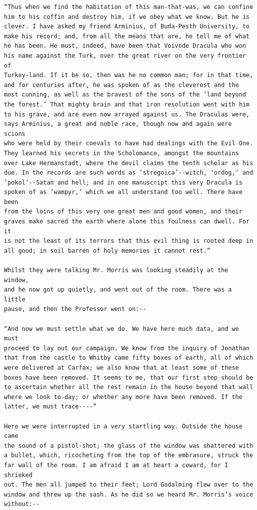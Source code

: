 \documentclass{article}
\begin{document}
\begin{verbatim}
“Thus when we find the habitation of this man-that-was, we can confine
him to his coffin and destroy him, if we obey what we know. But he is
clever. I have asked my friend Arminius, of Buda-Pesth University, to
make his record; and, from all the means that are, he tell me of what
he has been. He must, indeed, have been that Voivode Dracula who won
his name against the Turk, over the great river on the very frontier of
Turkey-land. If it be so, then was he no common man; for in that time,
and for centuries after, he was spoken of as the cleverest and the
most cunning, as well as the bravest of the sons of the ‘land beyond
the forest.’ That mighty brain and that iron resolution went with him
to his grave, and are even now arrayed against us. The Draculas were,
says Arminius, a great and noble race, though now and again were scions
who were held by their coevals to have had dealings with the Evil One.
They learned his secrets in the Scholomance, amongst the mountains
over Lake Hermanstadt, where the devil claims the tenth scholar as his
due. In the records are such words as ‘stregoica’--witch, ‘ordog,’ and
‘pokol’--Satan and hell; and in one manuscript this very Dracula is
spoken of as ‘wampyr,’ which we all understand too well. There have been
from the loins of this very one great men and good women, and their
graves make sacred the earth where alone this foulness can dwell. For it
is not the least of its terrors that this evil thing is rooted deep in
all good; in soil barren of holy memories it cannot rest.”

Whilst they were talking Mr. Morris was looking steadily at the window,
and he now got up quietly, and went out of the room. There was a little
pause, and then the Professor went on:--

“And now we must settle what we do. We have here much data, and we must
proceed to lay out our campaign. We know from the inquiry of Jonathan
that from the castle to Whitby came fifty boxes of earth, all of which
were delivered at Carfax; we also know that at least some of these
boxes have been removed. It seems to me, that our first step should be
to ascertain whether all the rest remain in the house beyond that wall
where we look to-day; or whether any more have been removed. If the
latter, we must trace----”

Here we were interrupted in a very startling way. Outside the house came
the sound of a pistol-shot; the glass of the window was shattered with
a bullet, which, ricocheting from the top of the embrasure, struck the
far wall of the room. I am afraid I am at heart a coward, for I shrieked
out. The men all jumped to their feet; Lord Godalming flew over to the
window and threw up the sash. As he did so we heard Mr. Morris’s voice
without:--


\end{verbatim}
\end{document}
